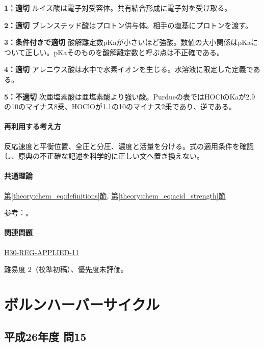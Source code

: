 \noindent\textbf{1：適切} ルイス酸は電子対受容体。共有結合形成に電子対を受け取る。\par

\noindent\textbf{2：適切} ブレンステッド酸はプロトン供与体。相手の塩基にプロトンを渡す。\par

\noindent\textbf{3：条件付きで適切} 酸解離定数pKaが小さいほど強酸。数値の大小関係はpKaについて正しい。pKaそのものを酸解離定数と呼ぶ点は不正確である。\par

\noindent\textbf{4：適切} アレニウス酸は水中で水素イオンを生じる。水溶液に限定した定義である。\par

\noindent\textbf{5：不適切} 次亜塩素酸は亜塩素酸より強い酸。Purdueの表ではHOClのKaが2.9の10のマイナス8乗、HOClOが1.1の10のマイナス2乗であり、逆である。\par

\paragraph{再利用する考え方} 反応速度と平衡位置、全圧と分圧、濃度と活量を分ける。式の適用条件を確認し、原典の不正確な記述を科学的に正しい文へ置き換えない。

\paragraph{共通理論} \hyperref[theory:chem_eq:definitions]{第\ref*{theory:chem_eq:definitions}節}, \hyperref[theory:chem_eq:acid_strength]{第\ref*{theory:chem_eq:acid_strength}節}

\par 参考：\cite{iupac_greenbook2012,purdue_acid_strength}。

\paragraph{関連問題} \hyperref[q:h30-reg-applied-11]{H30-REG-APPLIED-11}

\par 難易度 2（校準初稿）、優先度未評価。

\section{ボルンハーバーサイクル}

\subsection{平成26年度 問15}
\label{q:h26-reg-applied-15}

